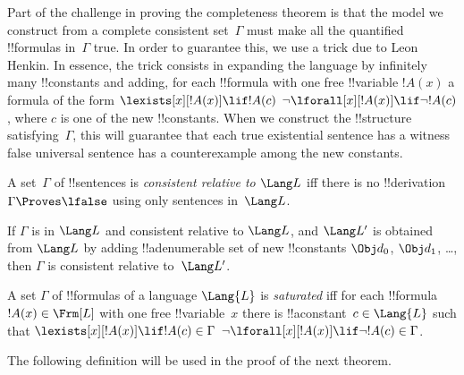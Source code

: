\documentclass[../../../include/open-logic-section]{subfiles}
\begin{document}


\begin{explain}
Part of the challenge in proving the completeness theorem is that the
model we construct from a complete consistent set~$\Gamma$ must make
all the quantified !!{formula}s in~$\Gamma$ true.  In order to
guarantee this, we use a trick due to Leon Henkin.  In essence, the
trick consists in expanding the language by infinitely many !!{constant}s
and adding, for each !!{formula} with one free !!{variable} $!A(x)$ a
formula of the form
      {$\lexists[x][!A(x)] \lif !A(c)$}
      {$\lnot\lforall[x][!A(x)] \lif \lnot !A(c)$},
where $c$ is one of the new !!{constant}s.  When we construct the
!!{structure} satisfying~$\Gamma$, this will guarantee that each
{true existential sentence has a witness}
{false universal sentence has a counterexample}
among the new constants.
\end{explain}

\begin{defn}
 A set~$\Gamma$ of !!{sentence}s is \emph{consistent relative to $\Lang L$} iff there is no !!{derivation} $\Gamma \Proves \lfalse$ using only sentences in~$\Lang L$.
\end{defn}

\begin{prop}
If $\Gamma$ is in \( \Lang L \) and consistent relative to \( \Lang L \), and $\Lang L'$ is obtained from
$\Lang L$ by adding !!a{denumerable} set of new !!{constant}s $\Obj d_0$,
$\Obj d_1$, \dots, then $\Gamma$ is consistent relative to~$\Lang L'$.
\end{prop}

\begin{defn}
A set $\Gamma$ of !!{formula}s of a language $\Lang {L}$ is
\emph{saturated} iff for each !!{formula}~$!A(x) \in \Frm[L]$ with one
free !!{variable}~$x$ there is !!a{constant}~$c \in \Lang{L}$ such
that
      {$\lexists[x][!A(x)] \lif !A(c) \in \Gamma$}
      {$\lnot\lforall[x][!A(x)] \lif \lnot !A(c) \in \Gamma$}.
\end{defn}

The following definition will be used in the proof of the next theorem.
\end{document}
